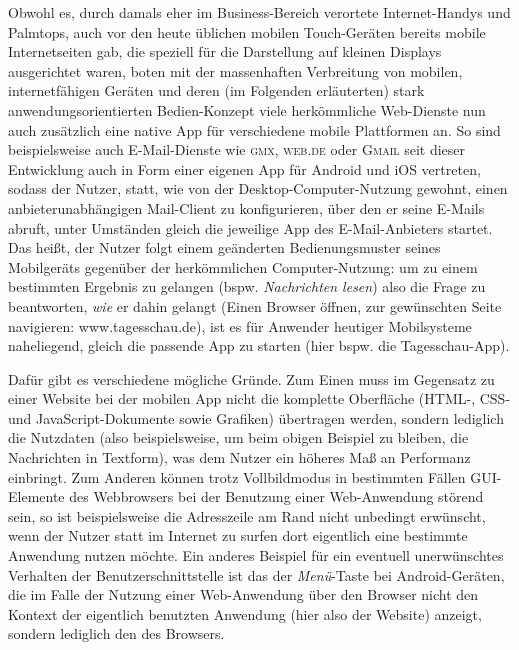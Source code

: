 Obwohl es, durch damals eher im Business-Bereich verortete Internet-Handys und Palmtops, auch vor den heute üblichen mobilen Touch-Geräten bereits mobile Internetseiten gab, die speziell für die Darstellung auf kleinen Displays ausgerichtet waren, boten mit der massenhaften Verbreitung von mobilen, internetfähigen Geräten und deren (im Folgenden erläuterten) stark anwendungsorientierten Bedien-Konzept viele herkömmliche Web-Dienste nun auch zusätzlich eine native App für verschiedene mobile Plattformen an.
So sind beispielsweise auch E-Mail-Dienste wie \textsc{gmx}\cite{gmx}, \textsc{web.de}\cite{web.de} oder \textsc{Gmail}\cite{gmail} seit dieser Entwicklung auch in Form einer eigenen App für Android und iOS vertreten, sodass der Nutzer, statt, wie von der Desktop-Computer-Nutzung gewohnt, einen anbieterunabhängigen Mail-Client zu konfigurieren, über den er seine E-Mails abruft, unter Umständen gleich die jeweilige App des E-Mail-Anbieters startet. 
Das heißt, der Nutzer folgt einem geänderten Bedienungsmuster seines Mobilgeräts gegenüber der herkömmlichen Computer-Nutzung: um zu einem bestimmten Ergebnis zu gelangen (bspw. \emph{Nachrichten lesen}) also die Frage zu beantworten, \emph{wie} er dahin gelangt (Einen Browser öffnen, zur gewünschten Seite navigieren: www.tagesschau.de), ist es für Anwender heutiger Mobilsysteme naheliegend, gleich die passende App zu starten (hier bspw. die Tagesschau-App).

Dafür gibt es verschiedene mögliche Gründe. Zum Einen muss im Gegensatz zu einer Website bei der mobilen App nicht die komplette Oberfläche (HTML-, CSS- und JavaScript-Dokumente sowie Grafiken) übertragen werden, sondern lediglich die Nutzdaten (also beispielsweise, um beim obigen Beispiel zu bleiben, die Nachrichten in Textform), was dem Nutzer ein höheres Maß an Performanz einbringt.
Zum Anderen können trotz Vollbildmodus in bestimmten Fällen GUI-Elemente des Webbrowsers bei der Benutzung einer Web-Anwendung störend sein, so ist beispielsweise die Adresszeile am Rand nicht unbedingt erwünscht, wenn der Nutzer statt im Internet zu surfen dort eigentlich eine bestimmte Anwendung nutzen möchte. 
Ein anderes Beispiel für ein eventuell unerwünschtes Verhalten der Benutzerschnittstelle ist das der \emph{Menü}-Taste bei Android-Geräten, die im Falle der Nutzung einer Web-Anwendung über den Browser nicht den Kontext der eigentlich benutzten Anwendung (hier also der Website) anzeigt, sondern lediglich den des Browsers.


